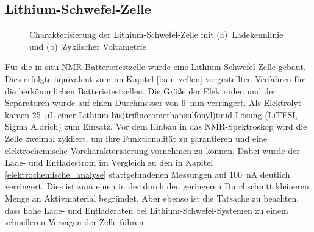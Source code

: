 \documentclass[a4paper, 11pt, headsepline,footsepline,twoside,abstract]{scrbook}
\begin{document}
\subsection{Lithium-Schwefel-Zelle}
\begin{figure}[b!]
   \centering
       \vspace{3mm}
       \vspace{3mm}
	\caption{Charakterisierung der Lithium-Schwefel-Zelle mit (a)~Ladekennlinie und (b)~Zyklischer Voltametrie}
   	\label{ec_LiS}
\end{figure}
Für die in-situ-NMR-Batterietestzelle wurde eine Lithium-Schwefel-Zelle gebaut. Dies erfolgte äquivalent zum im Kapitel \ref{bau_zellen} vorgestellten Verfahren für die herkömmlichen Batterietestzellen. Die Größe der Elektroden und der Separatoren wurde auf einen Durchmesser von \SI{6}{\milli\meter} verringert. Als Elektrolyt kamen \SI{25}{\micro\liter} einer Lithium-bis(trifluoromethansulfonyl)imid-Lösung (LiTFSI, Sigma Aldrich) zum Einsatz. Vor dem Einbau in das NMR-Spektroskop wird die Zelle zweimal zykliert, um ihre Funktionalität zu garantieren und eine elektrochemische Vorcharakterisierung vornehmen zu können. Dabei wurde der Lade- und Entladestrom im Vergleich zu den in Kapitel \ref{elektrochemische_analyse} stattgefundenen Messungen auf \SI{100}{\nano\ampere} deutlich verringert. Dies ist zum einen in der durch den geringeren Durchschnitt kleineren Menge an Aktivmaterial begründet. Aber ebenso ist die Tatsache zu beachten, dass hohe Lade- und Entladeraten bei Lithium-Schwefel-Systemen zu einem schnelleren Versagen der Zelle führen. 
\end{document}
